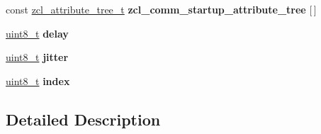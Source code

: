 \begin{DoxyCompactItemize}
\item 
\hypertarget{group__zcl__commissioning_ga730f27745b94d4b42586f78b880ee65f}{const \hyperlink{structzcl__attribute__tree__t}{zcl\-\_\-attribute\-\_\-tree\-\_\-t} {\bfseries zcl\-\_\-comm\-\_\-startup\-\_\-attribute\-\_\-tree} \mbox{[}$\,$\mbox{]}}\label{group__zcl__commissioning_ga730f27745b94d4b42586f78b880ee65f}

\item 
\hypertarget{group__zcl__commissioning_ga70fbd315df33bf9039e036725b569e7f}{\hyperlink{group__hal_gae1affc9ca37cfb624959c866a73f83c2}{uint8\-\_\-t} {\bfseries delay}}\label{group__zcl__commissioning_ga70fbd315df33bf9039e036725b569e7f}

\item 
\hypertarget{group__zcl__commissioning_gadf513be840f5d188d2adcd3045bff65c}{\hyperlink{group__hal_gae1affc9ca37cfb624959c866a73f83c2}{uint8\-\_\-t} {\bfseries jitter}}\label{group__zcl__commissioning_gadf513be840f5d188d2adcd3045bff65c}

\item 
\hypertarget{group__zcl__commissioning_gaae5a12e607d0f782506d9e6ec6179c64}{\hyperlink{group__hal_gae1affc9ca37cfb624959c866a73f83c2}{uint8\-\_\-t} {\bfseries index}}\label{group__zcl__commissioning_gaae5a12e607d0f782506d9e6ec6179c64}

\end{DoxyCompactItemize}


\subsection{Detailed Description}


